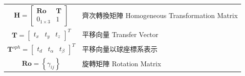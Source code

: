 \begin{longtable}[l]{cl}
    $\boldsymbol{H}=\left[\begin{array}{cc}
         \boldsymbol{Ro}  & \boldsymbol{T} \\
        0_{1\times3} & 1
        \end{array}\right]$ & 齊次轉換矩陣 Homogeneous Transformation Matrix\\
    $\boldsymbol{T}=\left[\begin{array}{ccc}t_x&t_y&t_z\end{array}\right]^T$ & 平移向量 Transfer Vector\\
    $\boldsymbol{T}^{sph}=\left[\begin{array}{ccc}t_d&t_{\alpha}&t_{\beta}\end{array}\right]^T$ & 平移向量以球座標系表示\\
    $\boldsymbol{Ro}=\left\{\gamma_{ij}\right\}$ & 旋轉矩陣 Rotation Matrix\\
\end{longtable}








